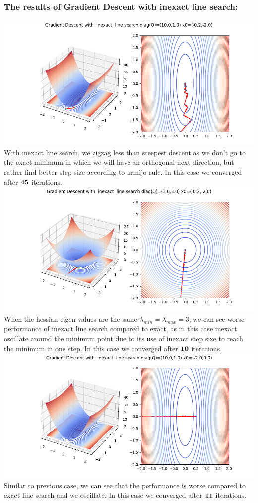 \documentclass{article}
\begin{document}
\subsubsection{The results of Gradient Descent with inexact line search:}
\includegraphics[scale=0.5]{grad_descent_inexact_1.png}
With inexact line search, we zigzag less than steepest descent as we don't go to the exact minimum in which we will have an orthogonal next direction, but rather find better step size according to armijo rule. In this case we converged after $\bold{45}$ iterations.\\
\newpage
\includegraphics[scale=0.5]{grad_descent_inexact_2_circle.png}
When the hessian eigen values are the same $\lambda_{min} = \lambda_{max} = 3$, we can see worse performance of inexact line search compared to exact, as in this case inexact oscillate around the minimum point due to its use of inexact step size to reach the minimum in one step. In this case we converged after $\bold{10}$ iterations.\\
\includegraphics[scale=0.5]{grad_descent_inexact_3_elipse_easy_start_point.png}
Similar to previous case, we can see that the performance is worse compared to exact line search and we oscillate. In this case we converged after $\bold{11}$ iterations.\\
\end{document}
